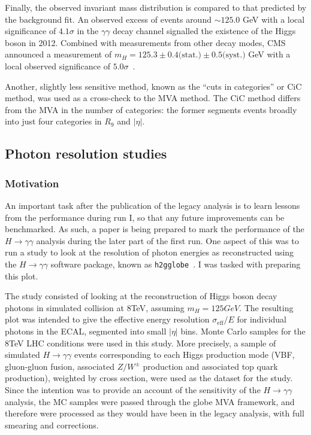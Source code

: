 \documentclass[10pt]{article}
\begin{document}
Finally, the observed invariant mass distribution is compared to that predicted by the background fit. An observed excess of events around $\sim125.0$ GeV with a local significance of $4.1 \sigma$ in the $\gamma \gamma$ decay channel signalled the existence of the Higgs boson in 2012. Combined with measurements from other decay modes, CMS announced a measurement of $m_H=125.3 \pm 0.4 \text{(stat.)} \pm 0.5 \text{(syst.)}$ GeV with a local observed significance of $5.0 \sigma$~\cite{HDisc}.

Another, slightly less sensitive method, known as the ``cuts in categories'' or CiC method, was used as a cross-check to the MVA method. The CiC method differs from the MVA in the number of categories: the former segments events broadly into just four categories in $R_9$ and $|\eta|$.

\subsection{Photon resolution studies}

\subsubsection{Motivation}

An important task after the publication of the legacy analysis is to learn lessons from the performance during run I, so that any future improvements can be benchmarked. As such, a paper is being prepared to mark the performance of the $H \rightarrow \gamma\gamma$ analysis during the later part of the first run. One aspect of this was to run a study to look at the resolution of photon energies as reconstructed using the $H \rightarrow \gamma\gamma$ software package, known as \texttt{h2gglobe}~\cite{globe}. I was tasked with preparing this plot.

The study consisted of looking at the reconstruction of Higgs boson decay photons in simulated collision at 8TeV, assuming $m_H = 125GeV$. The resulting plot was intended to give the effective energy resolution $\sigma_{\text{eff}}/E$ for individual photons in the ECAL, segmented into small $|\eta|$ bins.
Monte Carlo samples for the $8$TeV LHC conditions were used in this study. More precisely, a sample of simulated $H \rightarrow \gamma \gamma$ events corresponding to each Higgs production mode (VBF, gluon-gluon fusion, associated $Z/W^{\pm}$ production and associated top quark production), weighted by cross section, were used as the dataset for the study.
Since the intention was to provide an account of the sensitivity of the $H \rightarrow \gamma\gamma$ analysis, the MC samples were passed through the globe MVA framework, and therefore were processed as they would have been in the legacy analysis, with full smearing and corrections.
\end{document}

